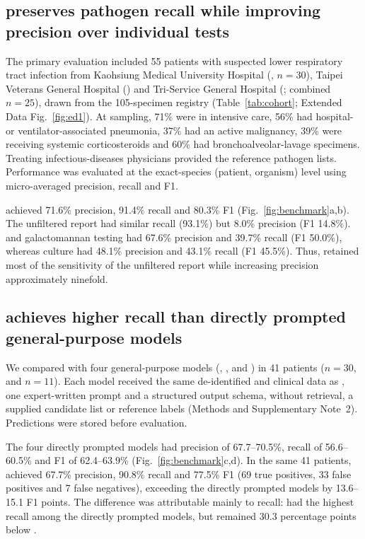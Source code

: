 \subsection*{\toolname preserves pathogen recall while improving precision over individual tests}

The primary evaluation included 55 patients with suspected lower respiratory tract infection from Kaohsiung Medical University Hospital (\kmuh, $n=30$), Taipei Veterans General Hospital (\tvgh) and Tri-Service General Hospital (\tsgh; combined $n=25$), drawn from the 105-specimen registry (Table~\ref{tab:cohort}; Extended Data Fig.~\ref{fig:ed1}). At sampling, 71\% were in intensive care, 56\% had hospital- or ventilator-associated pneumonia, 37\% had an active malignancy, 39\% were receiving systemic corticosteroids and 60\% had bronchoalveolar-lavage specimens. Treating infectious-diseases physicians provided the reference pathogen lists. Performance was evaluated at the exact-species (patient, organism) level using micro-averaged precision, recall and F1.

\toolname achieved 71.6\% precision, 91.4\% recall and 80.3\% F1 (Fig.~\ref{fig:benchmark}a,b). The unfiltered \mngs report had similar recall (93.1\%) but 8.0\% precision (F1 14.8\%). \filmarray and galactomannan testing had 67.6\% precision and 39.7\% recall (F1 50.0\%), whereas culture had 48.1\% precision and 43.1\% recall (F1 45.5\%). Thus, \toolname retained most of the sensitivity of the unfiltered report while increasing precision approximately ninefold.

\subsection*{\toolname achieves higher recall than directly prompted general-purpose models}

We compared \toolname with four general-purpose models (\gptsol, \gptluna, \gptterra and \gptastra) in 41 patients (\kmuh $n=30$, \tvgh and \tsgh $n=11$). Each model received the same de-identified \mngs and clinical data as \toolname, one expert-written prompt and a structured output schema, without retrieval, a supplied candidate list or reference labels (Methods and Supplementary Note~2). Predictions were stored before evaluation.

The four directly prompted models had precision of 67.7--70.5\%, recall of 56.6--60.5\% and F1 of 62.4--63.9\% (Fig.~\ref{fig:benchmark}c,d). In the same 41 patients, \toolname achieved 67.7\% precision, 90.8\% recall and 77.5\% F1 (69 true positives, 33 false positives and 7 false negatives), exceeding the directly prompted models by 13.6--15.1 F1 points. The difference was attributable mainly to recall: \gptastra had the highest recall among the directly prompted models, but remained 30.3 percentage points below \toolname. 

